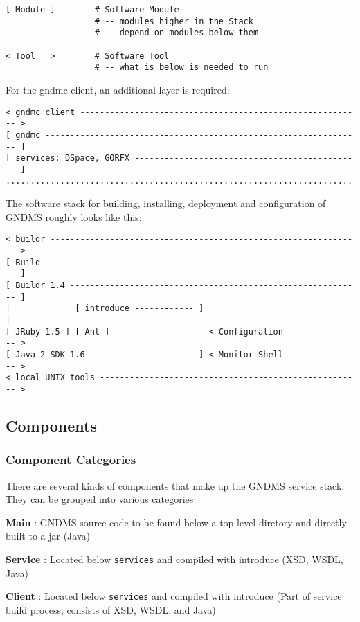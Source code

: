 \documentclass{article}
\begin{document}
\begin{verbatim}
[ Module ]        # Software Module
                  # -- modules higher in the Stack
                  # -- depend on modules below them

< Tool   >        # Software Tool
                  # -- what is below is needed to run
\end{verbatim}
For the gndmc client, an additional layer is required:

\begin{verbatim}
< gndmc client --------------------------------------------------------- >
[ gndmc ---------------------------------------------------------------- ]
[ services: DSpace, GORFX ---------------------------------------------- ]    
..........................................................................
\end{verbatim}
The software stack for building, installing, deployment and
configuration of GNDMS roughly looks like this:

\begin{verbatim}
< buildr --------------------------------------------------------------- >
[ Build ---------------------------------------------------------------- ]
[ Buildr 1.4 ----------------------------------------------------------- ] 
|             [ introduce ------------ ]                                 |
[ JRuby 1.5 ] [ Ant ]                    < Configuration --------------- >    
[ Java 2 SDK 1.6 --------------------- ] < Monitor Shell --------------- >
< local UNIX tools ----------------------------------------------------- > 
\end{verbatim}
\subsection{Components}

\subsubsection{Component Categories}

There are several kinds of components that make up the GNDMS
service stack. They can be grouped into various categories

\textbf{Main} : GNDMS source code to be found below a top-level
diretory and directly built to a jar (Java)

\textbf{Service} : Located below \verb!services! and compiled with
introduce (XSD, WSDL, Java)

\textbf{Client} : Located below \verb!services! and compiled with
introduce (Part of service build process, consists of XSD, WSDL,
and Java)
\end{document}
